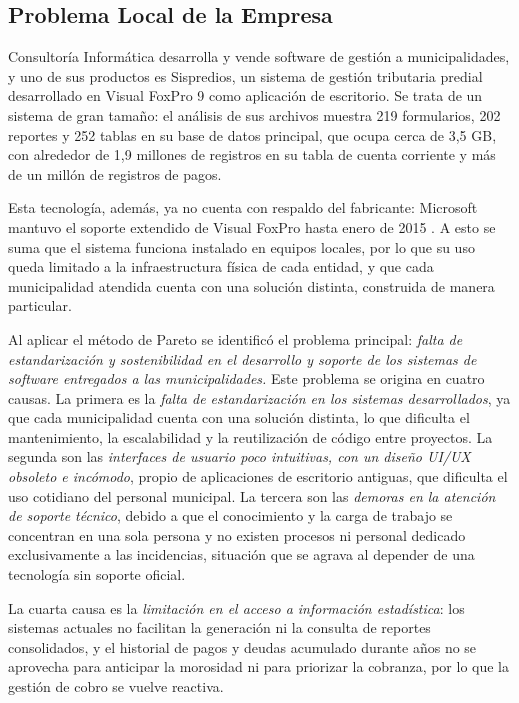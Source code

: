 \documentclass[12pt,a4paper]{report}
\begin{document}
\subsection{Problema Local de la Empresa}

Consultoría Informática desarrolla y vende software de gestión a municipalidades, y uno de sus productos es Sispredios, un sistema de gestión tributaria predial desarrollado en Visual FoxPro 9 como aplicación de escritorio. Se trata de un sistema de gran tamaño: el análisis de sus archivos muestra 219 formularios, 202 reportes y 252 tablas en su base de datos principal, que ocupa cerca de 3,5 GB, con alrededor de 1,9 millones de registros en su tabla de cuenta corriente y más de un millón de registros de pagos. %

Esta tecnología, además, ya no cuenta con respaldo del fabricante: Microsoft mantuvo el soporte extendido de Visual FoxPro hasta enero de 2015 \parencite{taft2007}. A esto se suma que el sistema funciona instalado en equipos locales, por lo que su uso queda limitado a la infraestructura física de cada entidad, y que cada municipalidad atendida cuenta con una solución distinta, construida de manera particular.

Al aplicar el método de Pareto se identificó el problema principal: \textit{falta de estandarización y sostenibilidad en el desarrollo y soporte de los sistemas de software entregados a las municipalidades.} Este problema se origina en cuatro causas. La primera es la \textit{falta de estandarización en los sistemas desarrollados}, ya que cada municipalidad cuenta con una solución distinta, lo que dificulta el mantenimiento, la escalabilidad y la reutilización de código entre proyectos. La segunda son las \textit{interfaces de usuario poco intuitivas, con un diseño UI/UX obsoleto e incómodo}, propio de aplicaciones de escritorio antiguas, que dificulta el uso cotidiano del personal municipal. La tercera son las \textit{demoras en la atención de soporte técnico}, debido a que el conocimiento y la carga de trabajo se concentran en una sola persona y no existen procesos ni personal dedicado exclusivamente a las incidencias, situación que se agrava al depender de una tecnología sin soporte oficial.

La cuarta causa es la \textit{limitación en el acceso a información estadística}: los sistemas actuales no facilitan la generación ni la consulta de reportes consolidados, y el historial de pagos y deudas acumulado durante años no se aprovecha para anticipar la morosidad ni para priorizar la cobranza, por lo que la gestión de cobro se vuelve reactiva. %
\end{document}
